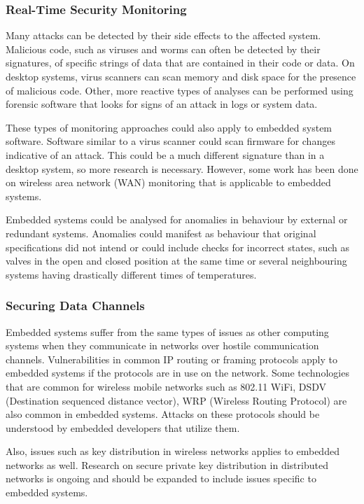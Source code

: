 \documentclass[final,conference,11pt]{IEEEtran}
\begin{document}
\subsubsection{Real-Time Security Monitoring}
Many attacks can be detected by their side effects to the affected system.  Malicious code, such as viruses and worms can often be detected by their signatures, of specific strings of data that are contained in their code or data.  On desktop systems, virus scanners can scan memory and disk space for the presence of malicious code.  Other, more reactive types of analyses can be performed using forensic software that looks for signs of an attack in logs or system data.  

These types of monitoring approaches could also apply to embedded system software.  Software similar to a virus scanner could scan firmware for changes indicative of an attack.  This could be a much different signature than in a desktop system, so more research is necessary.  However, some work has been done on wireless area network (WAN) monitoring that is applicable to embedded systems. \cite{}

Embedded systems could be analysed for anomalies in behaviour by external or redundant systems.  Anomalies could manifest as behaviour that original specifications did not intend or could include checks for incorrect states, such as valves in the open and closed position at the same time or several neighbouring systems having drastically different times of temperatures. \cite{Master Failure Detection Protocol in Internal Synchronization Environment} 

\subsubsection{Securing Data Channels}
Embedded systems suffer from the same types of issues as other computing systems when they communicate in networks over hostile communication channels.  Vulnerabilities in common IP routing or framing protocols apply to embedded systems if the protocols are in use on the network.  Some technologies that are common for wireless mobile networks such as 802.11 WiFi, DSDV (Destination sequenced distance vector), WRP (Wireless Routing Protocol) are also common in embedded systems. Attacks on these protocols should be understood by embedded developers that utilize them. 

Also, issues such as key distribution in wireless networks applies to embedded networks as well.  Research on secure private key distribution in distributed networks is ongoing and should be expanded to include issues specific to embedded systems.
\end{document}
